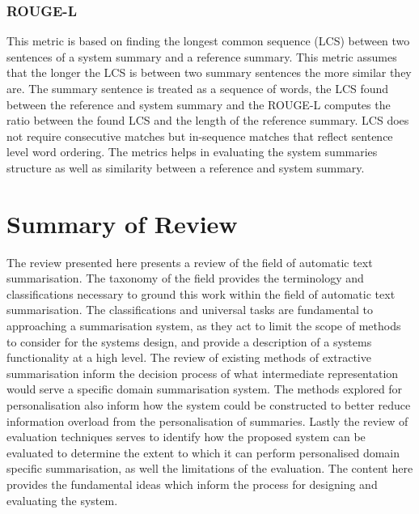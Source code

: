 \subsubsection{ROUGE-L}
This metric is based on finding the longest common sequence (LCS) between two sentences of a system summary and a reference summary. This metric assumes that the longer the LCS is between two summary sentences the more similar they are. The summary sentence is treated as a sequence of words, the LCS found between the reference and system summary and the ROUGE-L computes the ratio between the found LCS and the length of the reference summary. LCS does not require consecutive matches but in-sequence matches that reflect sentence level word ordering. The metrics helps in evaluating the system summaries structure as well as similarity between a reference and system summary.

\section{Summary of Review}
The review presented here presents a review of the field of automatic text summarisation. The taxonomy of the field provides the terminology and classifications necessary to ground this work within the field of automatic text summarisation. The classifications and universal tasks are fundamental to approaching a summarisation system, as they act to limit the scope of methods to consider for the systems design, and provide a description of a systems functionality at a high level. The review of existing methods of extractive summarisation inform the decision process of what intermediate representation would serve a specific domain summarisation system. The methods explored for personalisation also inform how the system could be constructed to better reduce information overload from the personalisation of summaries. Lastly the review of evaluation techniques serves to identify how the proposed system can be evaluated to determine the extent to which it can perform personalised domain specific summarisation, as well the limitations of the evaluation. The content here provides the fundamental ideas which inform the process for designing and evaluating the system. 